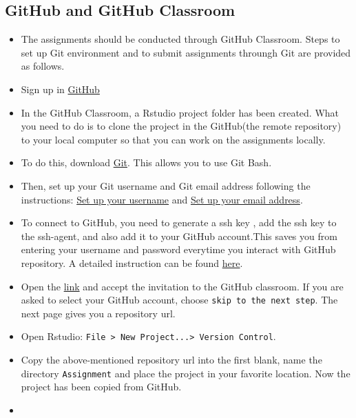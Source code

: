\documentclass[
]{book}
\begin{document}
\hypertarget{github-and-github-classroom}{%
\subsection{GitHub and GitHub Classroom}\label{github-and-github-classroom}}

\begin{itemize}
\item
  The assignments should be conducted through GitHub Classroom. Steps to set up Git environment and to submit assignments throungh Git are provided as follows.
\item
  Sign up in \href{https://github.com/}{GitHub}
\item
  In the GitHub Classroom, a Rstudio project folder has been created. What you need to do is to clone the project in the GitHub(the remote repository) to your local computer so that you can work on the assignments locally.
\item
  To do this, download \href{https://git-scm.com/download/win}{Git}. This allows you to use Git Bash.
\item
  Then, set up your Git username and Git email address following the instructions: \href{https://docs.github.com/en/github/using-git/setting-your-username-in-git}{Set up your username} and \href{https://docs.github.com/en/github/setting-up-and-managing-your-github-user-account/setting-your-commit-email-address}{Set up your email address}.
\item
  To connect to GitHub, you need to generate a ssh key , add the ssh key to the ssh-agent, and also add it to your GitHub account.This saves you from entering your username and password everytime you interact with GitHub repository. A detailed instruction can be found \href{https://docs.github.com/en/github/authenticating-to-github/connecting-to-github-with-ssh}{here}.
\item
  Open the \href{https://classroom.github.com/a/6Bp_Obm1}{link} and accept the invitation to the GitHub classroom. If you are asked to select your GitHub account, choose \texttt{skip\ to\ the\ next\ step}. The next page gives you a repository url.
\item
  Open Rstudio: \texttt{File\ \textgreater{}\ New\ Project...\textgreater{}\ Version\ Control}.
\item
  Copy the above-mentioned repository url into the first blank, name the directory \texttt{Assignment} and place the project in your favorite location. Now the project has been copied from GitHub.
\item

\end{itemize}
\end{document}
